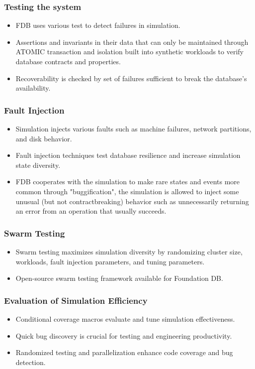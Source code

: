 \begin{frame}
    \frametitle{Testing the system}
    \begin{itemize}
        \item FDB uses various test to detect failures in simulation.
        \item Assertions and invariants
in their data that can only be maintained through ATOMIC transaction and isolation built into synthetic workloads to verify database contracts and properties.
        \item Recoverability is checked by set of failures sufficient to break
the database’s availability.
    \end{itemize}
\end{frame}
\begin{frame}
    \frametitle{Fault Injection}
    \begin{itemize}
        \item Simulation injects various faults such as machine failures, network partitions, and disk behavior.
        \item Fault injection techniques test database resilience and increase simulation state diversity.
        \item FDB cooperates with the simulation to make rare states and events more common through "buggification", the simulation is allowed to inject some unusual (but not contractbreaking) behavior such as unnecessarily returning an
error from an operation that usually succeeds.
    \end{itemize}
\end{frame}
\begin{frame}
    \frametitle{Swarm Testing}
    \begin{itemize}
        \item Swarm testing maximizes simulation diversity by randomizing cluster size, workloads, fault injection parameters, and tuning parameters.
        \item Open-source swarm testing framework available for Foundation DB.
    \end{itemize}
\end{frame}
\begin{frame}
    \frametitle{Evaluation of Simulation Efficiency}
    \begin{itemize}
        \item Conditional coverage macros evaluate and tune simulation effectiveness.
        \item Quick bug discovery is crucial for testing and engineering productivity.
        \item Randomized testing and parallelization enhance code coverage and bug detection.
    \end{itemize}
\end{frame}
